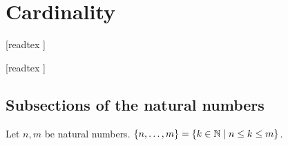 \documentclass[../arithmetic.tex]{subfiles}
\begin{document}
  \chapter{Cardinality}\label{chapter:cardinality}


  \begin{forthel}

    [readtex ]

    [readtex ]

  \end{forthel}


  \section{Subsections of the natural numbers}

  \begin{forthel}
    \begin{definition}
      Let $n, m$ be natural numbers.
      $\{ n, \dots, m \} = \{ k \in \mathbb{N} \mid n \leq k \leq m \}$.
    \end{definition}
  \end{forthel}
\end{document}

